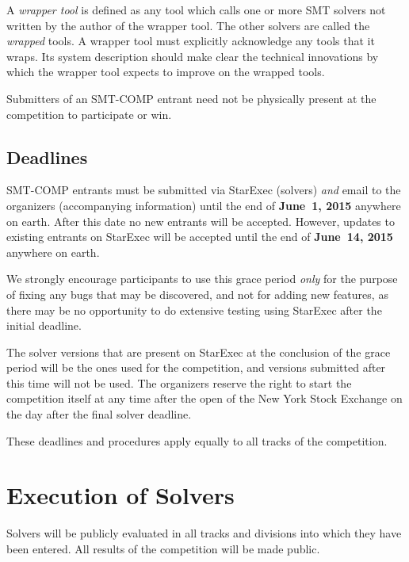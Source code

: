 \documentclass[12pt]{article}
\begin{document}
%
A \emph{wrapper tool} is defined as any tool which calls one or more
SMT solvers not written by the author of the wrapper tool.  The other
solvers are called the \emph{wrapped} tools.  A wrapper tool must
explicitly acknowledge any tools that it wraps.  Its system
description should make clear the technical innovations by which the
wrapper tool expects to improve on the wrapped tools.

%
Submitters of an SMT-COMP entrant need not be physically present at
the competition to participate or win.


\subsection*{Deadlines}

SMT-COMP entrants must be submitted via StarExec (solvers) \emph{and}
email to the organizers (accompanying information) until the end of
{\bf June~1, 2015} anywhere on earth.  After this date no new entrants
will be accepted.  However, updates to existing entrants on StarExec
will be accepted until the end of {\bf June~14, 2015} anywhere on
earth.

We strongly encourage participants to use this grace period
\emph{only} for the purpose of fixing any bugs that may be discovered,
and not for adding new features, as there may be no opportunity to do
extensive testing using StarExec after the initial deadline.

The solver versions that are present on StarExec at the conclusion of
the grace period will be the ones used for the competition, and
versions submitted after this time will not be used.  The organizers
reserve the right to start the competition itself at any time after
the open of the New York Stock Exchange on the day after the final
solver deadline.

These deadlines and procedures apply equally to all tracks of the
competition.


\section{Execution of Solvers}
\label{sec:exec}

Solvers will be publicly evaluated in all tracks and divisions into
which they have been entered.  All results of the competition will be
made public.
\end{document}
